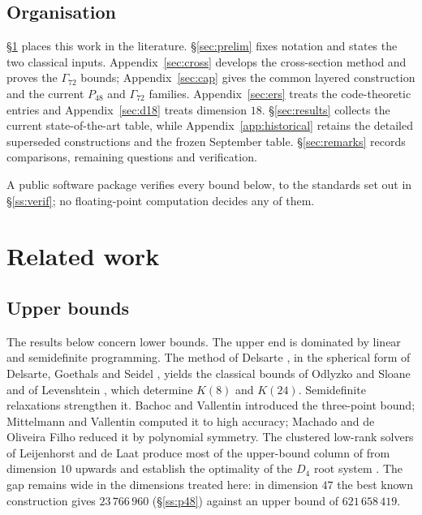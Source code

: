 \documentclass[11pt]{amsart}
\theoremstyle{remark}
\begin{document}
\subsection{Organisation}

\S\ref{sec:related} places this work in the literature. \S\ref{sec:prelim} fixes
notation and states the two classical inputs. Appendix~\ref{sec:cross} develops
the cross-section method and proves the $\Gamma_{72}$ bounds; Appendix~\ref{sec:cap}
gives the common layered construction and the current $P_{48}$ and $\Gamma_{72}$
families. Appendix~\ref{sec:ers} treats the code-theoretic entries and
Appendix~\ref{sec:d18} treats dimension $18$. \S\ref{sec:results} collects the
current state-of-the-art table, while Appendix~\ref{app:historical} retains the
detailed superseded constructions and the frozen September table. \S\ref{sec:remarks}
records comparisons, remaining questions and verification.

A public software package \cite{repo} verifies every bound below, to the
standards set out in \S\ref{ss:verif}; no floating-point computation decides any
of them.

\section{Related work}\label{sec:related}

\subsection{Upper bounds}\label{ss:rw-upper}

The results below concern lower bounds. The upper end is dominated by linear and
semidefinite programming. The method of Delsarte \cite{delsarte1973}, in the spherical
form of Delsarte, Goethals and Seidel \cite{delsarte-goethals-seidel1977}, yields the
classical bounds of Odlyzko and Sloane \cite{odlyzko-sloane1979} and of Levenshtein
\cite{levenshtein1979}, which determine $K(8)$ and $K(24)$. Semidefinite relaxations
strengthen it. Bachoc and Vallentin \cite{bachoc-vallentin2008} introduced the
three-point bound; Mittelmann and Vallentin \cite{mittelmann-vallentin2010} computed it
to high accuracy; Machado and de Oliveira Filho \cite{machado-oliveira2018} reduced it by
polynomial symmetry. The clustered low-rank solvers of Leijenhorst and de Laat
\cite{leijenhorst-delaat2024} produce most of the upper-bound column of
\cite{cohn-table} from dimension $10$ upwards and establish the optimality of the
$D_4$ root system \cite{delaat-leijenhorst-demuinckkeizer2024}. The gap remains wide in
the dimensions treated here: in dimension $47$ the best known construction gives
$23\,766\,960$ (\S\ref{ss:p48}) against an upper bound of $621\,658\,419$.
\end{document}
